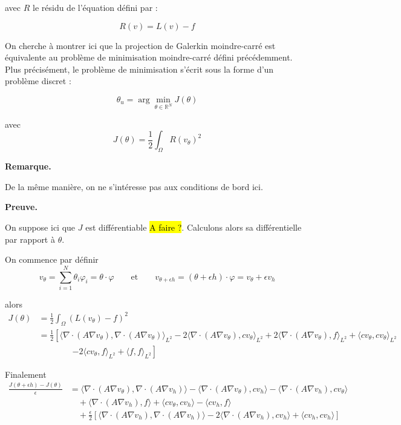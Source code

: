 \documentclass[french]{article}
\newenvironment{preuve}[1][]{\begin{tcolorbox}[
	colback=white, %
	colframe=green!70!black, %
	arc=2mm, %
	boxrule=1pt, %
	breakable, enhanced jigsaw
	]
	\textcolor{green!70!black}{\textbf{Preuve.} \\}

	#1
}{\end{tcolorbox}}
\newenvironment{remarque}[1][]{\begin{tcolorbox}[
	colback=white, %
	arc=2mm, %
	borderline={0.5mm}{0mm}{black!15!white},
	borderline={0.5mm}{0mm}{black!50!white,dashed},
	breakable, enhanced jigsaw
	]
	\textcolor{black!70!black}{\textbf{Remarque.}} #1
}{\end{tcolorbox}}
\begin{document}
\begin{itemize}[label=]
		avec $R$ le résidu de l'équation défini par :
		
		\begin{equation*}
			R(v) = L(v) - f
		\end{equation*}
		
		On cherche à montrer ici que la projection de Galerkin moindre-carré est équivalente au problème de minimisation moindre-carré défini précédemment. Plus précisément, le problème de minimisation s'écrit sous la forme d'un problème discret :
		
		\begin{equation}
			\theta_u = \arg\min_{\theta \in \mathbb{R}^N}J(\theta) \label{min_moindrecarre_discret}
		\end{equation}
		
		avec
		\begin{equation*}
			J(\theta)=\frac{1}{2}\int_\Omega R(v_\theta)^2
		\end{equation*}
		
		\begin{remarque}
			De la même manière, on ne s'intéresse pas aux conditions de bord ici.
		\end{remarque}
	
		\begin{preuve}			
			On suppose ici que $J$ est différentiable \hl{A faire ?}. Calculons alors sa différentielle par rapport à $\theta$.
			
			On commence par définir 
			\begin{equation*}
				v_\theta=\sum_{i=1}^{N} \theta_i \varphi_i=\theta\cdot\varphi \qquad \text{et} \qquad v_{\theta+\epsilon h}=(\theta+\epsilon h)\cdot\varphi=v_\theta+\epsilon v_h
			\end{equation*}
			
			alors 
			\begin{align*}
				J(\theta) &= \frac{1}{2} \int_{\Omega} (L(v_\theta) - f)^2 \\
				&= \frac{1}{2}\left[\langle \nabla\cdot(A\nabla v_\theta), \nabla\cdot(A\nabla v_\theta) \rangle_{L^2} -2 \langle \nabla\cdot(A\nabla v_\theta), cv_\theta \rangle_{L^2} +2 \langle \nabla\cdot(A\nabla v_\theta), f \rangle_{L^2} + \langle cv_\theta, cv_\theta \rangle_{L^2}\right. \\
				& \qquad \qquad \left.-2 \langle cv_\theta,f\rangle_{L^2} + \langle f, f \rangle_{L^2}\right]
			\end{align*}
			
			Finalement
			\begin{align*}
				\frac{J(\theta+\epsilon h)-J(\theta)}{\epsilon}&= \langle \nabla\cdot(A\nabla v_\theta), \nabla\cdot(A\nabla v_h) \rangle-\langle \nabla\cdot(A\nabla v_\theta), cv_h \rangle-\langle \nabla\cdot(A\nabla v_h), cv_\theta \rangle \\ 
				& \quad +\langle \nabla\cdot(A\nabla v_h), f \rangle + \langle cv_\theta, cv_h \rangle -\langle cv_h,f\rangle \\
				& \quad + \frac{\epsilon}{2}\left[\langle \nabla\cdot(A\nabla v_h), \nabla\cdot(A\nabla v_h) \rangle-2\langle \nabla\cdot(A\nabla v_h), cv_h \rangle+ \langle cv_h, cv_h \rangle \right]
			\end{align*}
			

\end{preuve}
\end{itemize}
\end{document}
